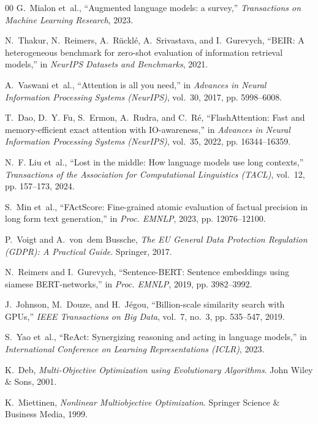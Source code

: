 \documentclass[conference,onecolumn,10pt]{IEEEtran}
\begin{document}
\begin{thebibliography}{00}
G.~Mialon et~al., ``Augmented language models: a survey,'' \textit{Transactions on Machine Learning Research}, 2023.

N.~Thakur, N.~Reimers, A.~R{\"u}ckl{\'e}, A.~Srivastava, and I.~Gurevych, ``{BEIR}: A heterogeneous benchmark for zero-shot evaluation of information retrieval models,'' in \textit{NeurIPS Datasets and Benchmarks}, 2021.

A.~Vaswani et~al., ``Attention is all you need,'' in \textit{Advances in Neural Information Processing Systems (NeurIPS)}, vol.~30, 2017, pp. 5998--6008.

T.~Dao, D.~Y. Fu, S.~Ermon, A.~Rudra, and C.~R{\'e}, ``{FlashAttention}: Fast and memory-efficient exact attention with {IO}-awareness,'' in \textit{Advances in Neural Information Processing Systems (NeurIPS)}, vol.~35, 2022, pp. 16344--16359.

N.~F. Liu et~al., ``Lost in the middle: How language models use long contexts,'' \textit{Transactions of the Association for Computational Linguistics (TACL)}, vol.~12, pp. 157--173, 2024.

S.~Min et~al., ``{FActScore}: Fine-grained atomic evaluation of factual precision in long form text generation,'' in \textit{Proc. EMNLP}, 2023, pp. 12076--12100.

P.~Voigt and A.~von~dem Bussche, \textit{The {EU} General Data Protection Regulation ({GDPR}): A Practical Guide}. Springer, 2017.

N.~Reimers and I.~Gurevych, ``Sentence-{BERT}: Sentence embeddings using siamese {BERT}-networks,'' in \textit{Proc. EMNLP}, 2019, pp. 3982--3992.

J.~Johnson, M.~Douze, and H.~J{\'e}gou, ``Billion-scale similarity search with {GPUs},'' \textit{IEEE Transactions on Big Data}, vol.~7, no.~3, pp. 535--547, 2019.

S.~Yao et~al., ``{ReAct}: Synergizing reasoning and acting in language models,'' in \textit{International Conference on Learning Representations (ICLR)}, 2023.

K.~Deb, \textit{Multi-Objective Optimization using Evolutionary Algorithms}. John Wiley \& Sons, 2001.

K.~Miettinen, \textit{Nonlinear Multiobjective Optimization}. Springer Science \& Business Media, 1999.


\end{thebibliography}
\end{document}
